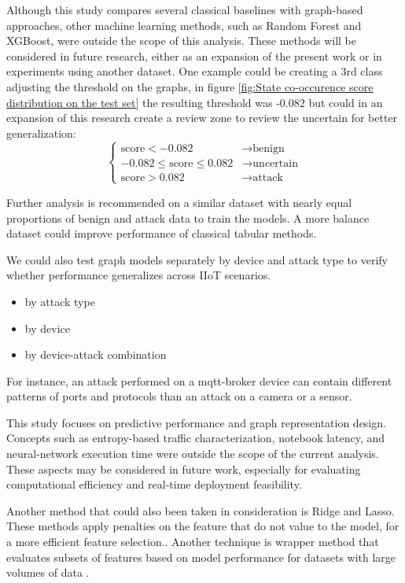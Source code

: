 \documentclass[final,5p,times,twocolumn]{elsarticle}
\begin{document}
Although this study compares several classical baselines with graph-based approaches, other machine learning methods, such as Random Forest and XGBoost, were outside the scope of this analysis. These methods will be considered in future research, either as an expansion of the present work or in experiments using another dataset. {\color{red}One example could be creating a 3rd class adjusting the threshold on the graphs, in figure \ref{fig:State co-occurence score distribution on the test set} the resulting threshold was -0.082 but could in an expansion of this research create a review zone to review the uncertain for better generalization:}
{\color{red}
\[
\begin{cases}
\text{score} < -0.082 & \rightarrow \text{benign} \\
-0.082 \leq \text{score} \leq 0.082 & \rightarrow \text{uncertain} \\
\text{score} > 0.082 & \rightarrow \text{attack}
\end{cases}
\]
}

Further analysis is recommended on a similar dataset with nearly equal proportions of benign and attack data to train the models. A more balance dataset could improve performance of classical tabular methods.

We could also test graph models separately by device and attack type to verify whether performance generalizes across IIoT scenarios.


\begin{itemize}
    \item by attack type
    \item by device
    \item by device-attack combination
\end{itemize}

For instance, an attack performed on a mqtt-broker device can contain different patterns of ports and protocols than an attack on a camera or a sensor.

This study focuses on predictive performance and graph representation design. Concepts such as entropy-based traffic characterization, notebook latency, and neural-network execution time were outside the scope of the current analysis. These aspects may be considered in future work, especially for evaluating computational efficiency and real-time deployment feasibility.

Another method that could also been taken in consideration is Ridge and Lasso. These methods apply penalties on the feature that do not value to the model,  for a more efficient feature selection.\citep{alma990016042380204808}. 
Another technique is wrapper method that evaluates subsets of features based on model performance for datasets with large volumes of data \citep{ahmed2025pcm}.
\end{document}
